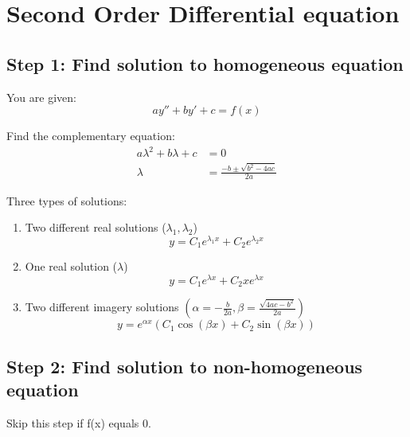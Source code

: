 \section{Second Order Differential equation}
	\subsection{Step 1: Find solution to homogeneous equation}
	You are given: 
	$$\displaystyle ay''+by'+c=f(x)$$
	
	\noindent Find the complementary equation:
	\begin{align*}
	a\lambda^2+b\lambda+c&=0	\\
	\lambda&=\frac{-b\pm\sqrt{b^2-4ac}}{2a}
	\end{align*}
	
	\noindent Three types of solutions:
	\begin{enumerate}
	\item Two different real solutions ($\lambda_1, \lambda_2$)
	\begin{equation}
	y=C_1e^{\lambda_1x}+C_2e^{\lambda_2x}
	\end{equation}
	
	\item One real solution ($\lambda$)
	\begin{equation}
	y=C_1e^{\lambda x}+C_2xe^{\lambda x}
	\end{equation}
	
	\item Two different imagery solutions $\left(\alpha=-\frac{b}{2a}, \beta=\frac{\sqrt{4ac-b^2}}{2a}\right)$
	\begin{equation}
	y=e^{\alpha x}\left(C_1\cos{(\beta x)}+C_2\sin{(\beta x)}\right)
	\end{equation}
	\end{enumerate}
	
	\subsection{Step 2: Find solution to non-homogeneous equation}
	Skip this step if f(x) equals 0.
	
